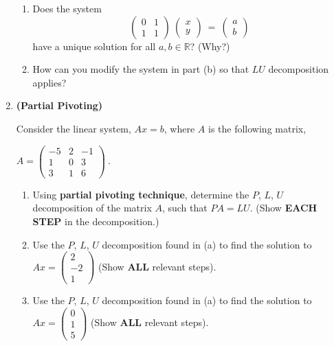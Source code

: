 \documentclass [12pt]{article}
\begin{document}
\begin{enumerate}
\begin{enumerate}
\item   Does the system
$$
\begin{pmatrix} 0 & 1 \\ 1 & 1 \end{pmatrix} \
\begin{pmatrix} x \\ y \end{pmatrix} \ = \
\begin{pmatrix} a \\ b \end{pmatrix}
$$
have a unique solution for all $a,b \in \mathbb{R}$? (Why?)

\item   How can you modify the system in part (b) so that $LU$
decomposition applies?
\end{enumerate}


\item \textbf{(Partial Pivoting)}

{Consider the linear system, $Ax=b$,}
     where $A$ is the following matrix,
     \begin{center}
               $A=\left (
        \begin{array}{rrr}
        -5  &   2  &   -1   \\
        1  &   0  &   3   \\
        3  &   1  &   6
        \end{array}
        \right )~.~$
    \end{center}

    \begin{enumerate}
    \item{Using {\bf partial pivoting technique},
    determine the $P$, $L$, $U$ decomposition of the matrix $A$, such that
    $PA = LU$. (Show {\bf EACH STEP} in the decomposition.) }
    \item{Use the $P$, $L$, $U$ decomposition found in (a) to find the solution to \\
    $Ax=\left ( \begin{array}{r} 2\\ -2\\ 1 \end{array} \right )$
    (Show {\bf ALL} relevant steps).}
    \item{Use the $P$, $L$, $U$ decomposition found in (a) to find the solution to \\
    $Ax=\left ( \begin{array}{r} 0\\ 1\\ 5  \end{array} \right )$
    (Show {\bf ALL} relevant steps).}
    \end{enumerate}


\end{enumerate}
\end{document}
